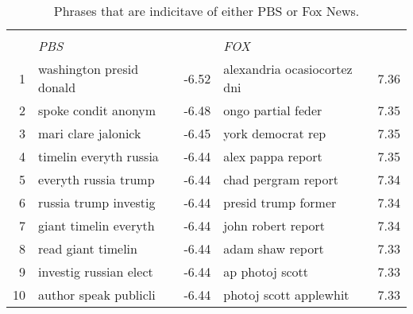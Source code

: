 \begin{table}[H]
\caption{Phrases that are indicitave of either PBS or Fox News.}
\label{tab:pbs_fox}
\centering
\begin{tabular}{r||lr|lr}
  \hline \hline
  &             &        &             &        \\
 & \textit{PBS} &  & \textit{FOX} & \\ 
  \hline
1 & washington presid donald & -6.52 & alexandria ocasiocortez dni & 7.36 \\ 
  2 & spoke condit anonym & -6.48 & ongo partial feder & 7.35 \\ 
  3 & mari clare jalonick & -6.45 & york democrat rep & 7.35 \\ 
  4 & timelin everyth russia & -6.44 & alex pappa report & 7.35 \\ 
  5 & everyth russia trump & -6.44 & chad pergram report & 7.34 \\ 
  6 & russia trump investig & -6.44 & presid trump former & 7.34 \\ 
  7 & giant timelin everyth & -6.44 & john robert report & 7.34 \\ 
  8 & read giant timelin & -6.44 & adam shaw report & 7.33 \\ 
  9 & investig russian elect & -6.44 & ap photoj scott & 7.33 \\ 
  10 & author speak publicli & -6.44 & photoj scott applewhit & 7.33 \\ 
   \hline
\end{tabular}
\end{table}
